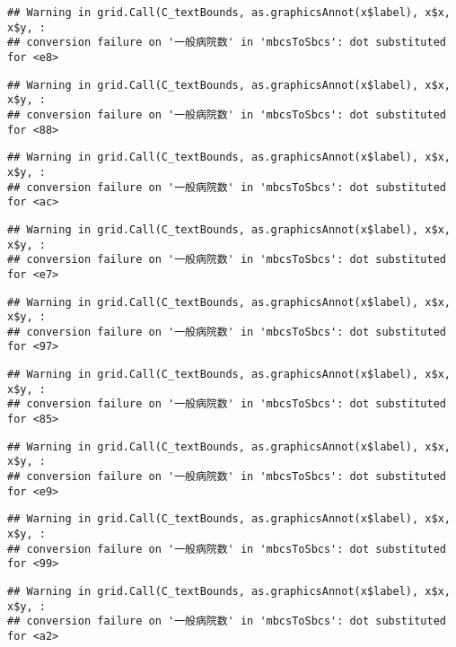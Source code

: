 \documentclass[
]{article}
\begin{document}
\begin{verbatim}
## Warning in grid.Call(C_textBounds, as.graphicsAnnot(x$label), x$x, x$y, :
## conversion failure on '一般病院数' in 'mbcsToSbcs': dot substituted for <e8>
\end{verbatim}

\begin{verbatim}
## Warning in grid.Call(C_textBounds, as.graphicsAnnot(x$label), x$x, x$y, :
## conversion failure on '一般病院数' in 'mbcsToSbcs': dot substituted for <88>
\end{verbatim}

\begin{verbatim}
## Warning in grid.Call(C_textBounds, as.graphicsAnnot(x$label), x$x, x$y, :
## conversion failure on '一般病院数' in 'mbcsToSbcs': dot substituted for <ac>
\end{verbatim}

\begin{verbatim}
## Warning in grid.Call(C_textBounds, as.graphicsAnnot(x$label), x$x, x$y, :
## conversion failure on '一般病院数' in 'mbcsToSbcs': dot substituted for <e7>
\end{verbatim}

\begin{verbatim}
## Warning in grid.Call(C_textBounds, as.graphicsAnnot(x$label), x$x, x$y, :
## conversion failure on '一般病院数' in 'mbcsToSbcs': dot substituted for <97>
\end{verbatim}

\begin{verbatim}
## Warning in grid.Call(C_textBounds, as.graphicsAnnot(x$label), x$x, x$y, :
## conversion failure on '一般病院数' in 'mbcsToSbcs': dot substituted for <85>
\end{verbatim}

\begin{verbatim}
## Warning in grid.Call(C_textBounds, as.graphicsAnnot(x$label), x$x, x$y, :
## conversion failure on '一般病院数' in 'mbcsToSbcs': dot substituted for <e9>
\end{verbatim}

\begin{verbatim}
## Warning in grid.Call(C_textBounds, as.graphicsAnnot(x$label), x$x, x$y, :
## conversion failure on '一般病院数' in 'mbcsToSbcs': dot substituted for <99>
\end{verbatim}

\begin{verbatim}
## Warning in grid.Call(C_textBounds, as.graphicsAnnot(x$label), x$x, x$y, :
## conversion failure on '一般病院数' in 'mbcsToSbcs': dot substituted for <a2>
\end{verbatim}
\end{document}
